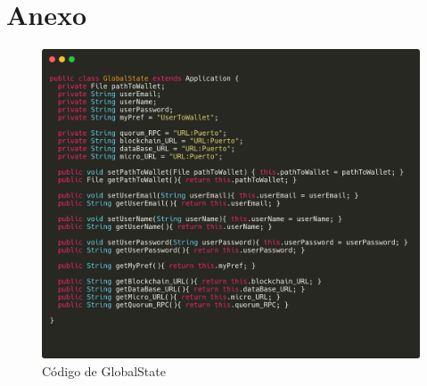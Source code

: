 \chapter{Anexo}
\label{cap:Anexo}

\begin{figure}[h!]
  \centering
  \includegraphics[width=1\linewidth]{figs/Anexo/gs}
  \caption[Código de GlobalState]{Código de GlobalState}
  \label{fig:gs}
\end{figure}


